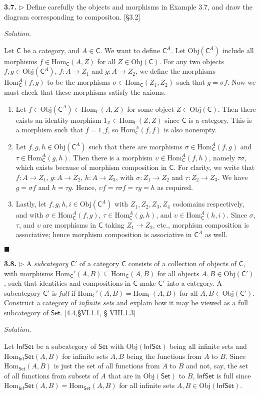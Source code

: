 \documentclass[14pt,parskip=full]{scrartcl}
\newcommand{\exercise}[3]{
\noindent
\textbf{#1.} #2

\noindent
\textit{Solution.}{\let\tpar\par \let\par\relax #3}
}
\newcommand*{\QEDA}{\hfill\ensuremath{\blacksquare}}
\newcommand{\Obj}{\mathrm{Obj}}
\newcommand{\Hom}{\mathrm{Hom}}
\begin{document}
\exercise
{3.7}{$\rhd$ Define carefully the objects and morphisms in Example 3.7, and draw
the diagram corresponding to compositon. [\S 3.2]}{

\def \C {\mathsf{C}}
\def \CA {\mathsf{C}^A}

Let $\C$ be a category, and $A\in\C$. We want to define $\CA$. Let $\Obj(\CA)$
include all morphisms $f\in\Hom_\C(A,Z)$ for all $Z\in\Obj(\C)$. For any two
objects $f,g\in\Obj(\CA)$, $f:A\to Z_1$ and $g:A\to Z_2$, we define the
morphisms $\Hom_\CA(f,g)$ to be the morphisms $\sigma\in\Hom_\C(Z_1, Z_2)$ such
that $g=\sigma f$. Now we must check that these morphisms satisfy the axioms.

\tpar
\begin{enumerate}
  \item Let $f\in\Obj(\CA)\in\Hom_\C(A,Z)$ for some object $Z\in\Obj(\C)$. Then
there exists an identity morphism $1_Z\in\Hom_\C(Z,Z)$ since $\C$ is a category.
This is a morphism such that $f=1_zf$, so $\Hom_\CA(f,f)$ is also nonempty.
  \item Let $f,g,h\in\Obj(\CA)$ such that there are morphisms
$\sigma\in\Hom_\CA(f,g)$ and $\tau\in\Hom_\CA(g,h)$. Then there is a morphism
$\upsilon\in\Hom_\CA(f,h)$, namely $\tau\sigma$, which exists because of
morphism composition in $\C$. For clarity, we write that  $f:A\to Z_1$, $g:A\to
Z_2$, $h:A\to Z_3$, with $\sigma:Z_1\to Z_2$ and $\tau:Z_2\to Z_3$. We have
$g=\sigma f$ and $h=\tau g$. Hence, $\upsilon f = \tau\sigma f = \tau g = h$ as
required.
  \item Lastly, let $f,g,h,i\in\Obj(\CA)$ with $Z_1, Z_2, Z_3, Z_4$ codomains
respectively, and with $\sigma\in\Hom_\CA(f,g)$, $\tau\in\Hom_\CA(g,h)$, and
$\upsilon\in\Hom_\CA(h,i)$. Since $\sigma$, $\tau$, and $\upsilon$ are morphisms
in $\C$ taking $Z_1\to Z_2$, etc., morphism composition is associative; hence
morphism composition is associative in $\CA$ as well.
\end{enumerate}

\QEDA

}

{ \def \C {\mathsf{C}} \def \Cp {\C'}
\exercise
{3.8}{$\rhd$ A \textit{subcategory} $\Cp$ of a category $\C$ consists of a
collection of objects of $\C$, with morphisms
$\Hom_\Cp(A,B) \subseteq \Hom_\C(A,B)$ for all objects $A,B\in\Obj(\Cp)$, such
that identities and compositions in $\C$ make $\Cp$ into a category. A
subcategory $\Cp$ is \textit{full} if $\Hom_\Cp(A,B) = \Hom_\C(A,B)$ for all
$A,B\in\Obj(\Cp)$. Construct a category of \textit{infinite sets} and explain
how it may be viewed as a full subcategory of $\mathsf{Set}$. [4.4,\S VI.1.1, \S
VIII.1.3]}{

\def \Set {\mathsf{Set}}
\def \ISet {\mathsf{Inf}\mathsf{Set}}

Let $\ISet$ be a subcategory of $\Set$ with $\Obj(\ISet)$ being all infinite
sets and $\Hom_\ISet(A,B)$ for infinite sets $A,B$ being the functions from $A$
to $B$. Since $\Hom_\Set(A,B)$ is just the set of all functions from $A$ to $B$
and not, say, the set of all functions from subsets of $A$ that are in
$\Obj(\Set)$ to $B$, $\ISet$ is full since $\Hom_\ISet(A,B)=\Hom_\Set(A,B)$ for
all infinite sets $A,B\in\Obj(\ISet)$.

}}
\end{document}
